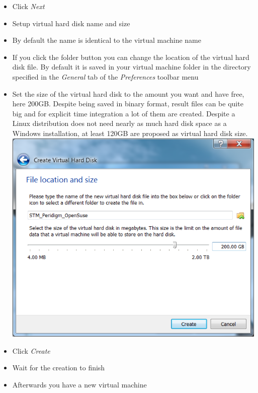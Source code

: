 \begin{enumerate}[noitemsep]
\begin{itemize}
      \item Click \textit{Next}
      \item Setup virtual hard disk name and size
      \item By default the name is identical to the virtual machine name
      \item If you click the folder button you can change the location of the virtual hard disk file. By default it is saved in your virtual machine folder in the directory specified in the \textit{General} tab of the \textit{Preferences} toolbar menu
      \item Set the size of the virtual hard disk to the amount you want and have free, here 200GB. Despite being saved in binary format, \marktool{\toolname} result files can be quite big and for explicit time integration a lot of them are created. Despite a Linux distribution does not need nearly as much hard disk space as a Windows installation, at least 120GB are proposed as virtual hard disk size.\\
      \includegraphics[scale=\screenshotscalefac]{Figures/VirtualBox_Create_VirtualMachine_Harddisk_Location}
      \item Click \textit{Create}
      \item Wait for the creation to finish
      \item Afterwards you have a new virtual machine\\

\end{itemize}
\end{enumerate}
